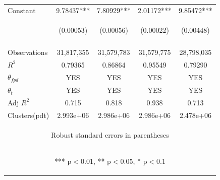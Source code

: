 \documentclass[]{article}
\begin{document}
\begin{center}
\begin{tabular}{lcccc}
Constant & 9.78437*** & 7.80929*** & 2.01172*** & 9.85472*** \\
 & \begin{footnotesize}(0.00053)\end{footnotesize} & \begin{footnotesize}(0.00056)\end{footnotesize} & \begin{footnotesize}(0.00022)\end{footnotesize} & \begin{footnotesize}(0.00448)\end{footnotesize} \\
\vspace{4pt} & \begin{footnotesize}\end{footnotesize} & \begin{footnotesize}\end{footnotesize} & \begin{footnotesize}\end{footnotesize} & \begin{footnotesize}\end{footnotesize} \\
Observations & 31,817,355 & 31,579,783 & 31,579,775 & 28,798,035 \\
$R^2$ & 0.79365 & 0.86864 & 0.95549 & 0.79290 \\
$\theta_{fpd}$ & YES & YES & YES & YES \\
$\theta_t$ & YES & YES & YES & YES \\
Adj $R^2$ & 0.715 & 0.818 & 0.938 & 0.713 \\
 Clusters(pdt) & 2.993e+06 & 2.986e+06 & 2.986e+06 & 2.478e+06 \\ \hline
\multicolumn{5}{c}{\begin{footnotesize} Robust standard errors in parentheses\end{footnotesize}} \\
\multicolumn{5}{c}{\begin{footnotesize} *** p$<$0.01, ** p$<$0.05, * p$<$0.1\end{footnotesize}} \\
\end{tabular}
\end{center}
\end{document}
